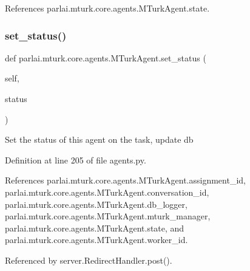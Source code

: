 References parlai.\+mturk.\+core.\+agents.\+M\+Turk\+Agent.\+state.

\mbox{\label{classparlai_1_1mturk_1_1core_1_1agents_1_1MTurkAgent_a59bc035a28a067a5408a2c15f9f94604}} 
\subsubsection{\texorpdfstring{set\+\_\+status()}{set\_status()}}
{\footnotesize\ttfamily def parlai.\+mturk.\+core.\+agents.\+M\+Turk\+Agent.\+set\+\_\+status (\begin{DoxyParamCaption}\item[{}]{self,  }\item[{}]{status }\end{DoxyParamCaption})}

\begin{DoxyVerb}Set the status of this agent on the task, update db\end{DoxyVerb}
 

Definition at line 205 of file agents.\+py.



References parlai.\+mturk.\+core.\+agents.\+M\+Turk\+Agent.\+assignment\+\_\+id, parlai.\+mturk.\+core.\+agents.\+M\+Turk\+Agent.\+conversation\+\_\+id, parlai.\+mturk.\+core.\+agents.\+M\+Turk\+Agent.\+db\+\_\+logger, parlai.\+mturk.\+core.\+agents.\+M\+Turk\+Agent.\+mturk\+\_\+manager, parlai.\+mturk.\+core.\+agents.\+M\+Turk\+Agent.\+state, and parlai.\+mturk.\+core.\+agents.\+M\+Turk\+Agent.\+worker\+\_\+id.



Referenced by server.\+Redirect\+Handler.\+post().

